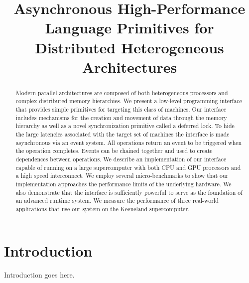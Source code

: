 \documentclass{sig-alternate}
\begin{document}
\title{Asynchronous High-Performance Language Primitives for Distributed Heterogeneous Architectures}
\author{}
\maketitle

\begin{abstract}
Modern parallel architectures are composed of both heterogeneous processors
and complex distributed memory hierarchies.  We present a low-level programming
interface that provides simple primitives for targeting this class of
machines.  Our interface includes mechanisms for the creation and movement
of data through the memory hierarchy as well as a novel synchronization primitive 
called a deferred lock.  To hide the large latencies associated with the target
set of machines the interface is made asynchronous via an event system.  All
operations return an event to be triggered when the operation completes.  Events
can be chained together and used to create dependences between operations.
We describe an implementation of our interface capable of running on
a large supercomputer with both CPU and GPU processors and a high speed interconnect.
We employ several micro-benchmarks to show that our implementation approaches
the performance limits of the underlying hardware.
We also demonstrate that the interface is sufficiently powerful to serve as the foundation 
of an advanced runtime system.  We measure the performance of three real-world applications
that use our system on the Keeneland supercomputer.
\end{abstract}

\section{Introduction}
\label{sect:intro}
Introduction goes here.





{
\small

}
\end{document}
